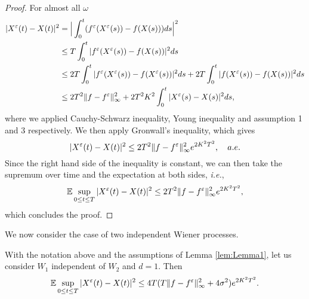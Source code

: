 \begin{proof}
For almost all $\omega$
\begin{equation*}
\begin{aligned}
	|X^\varepsilon(t) - X(t)|^2  &= \Big|\int_0^t (f^\varepsilon (X^\varepsilon(s)) - f(X(s)))ds \Big|^2 \\
	&\leq T \int_0^t |f^\varepsilon (X^\varepsilon(s)) - f(X(s))|^2 ds  \\
	&\leq 2T \int_0^t |f^\varepsilon (X^\varepsilon(s)) - f(X^\varepsilon(s))|^2 ds + 2T \int_0^t |f (X^\varepsilon(s)) - f(X(s))|^2 ds \\
	&\leq 2T^2 \|f - f^\varepsilon\|_{\infty}^2 + 2T^2K^2 \int_0^t |X^\varepsilon(s) - X(s)|^2ds,
\end{aligned} 
\end{equation*}
where we applied Cauchy-Schwarz inequality, Young inequality and assumption 1 and 3 respectively. We then apply Gronwall's inequality, which gives 
\begin{equation}\label{eq:TheoryEpsilon}
	|X^\varepsilon(t) - X(t)|^2 \leq  2T^2 \|f - f^\varepsilon\|_{\infty}^2 e^{2K^2T^2}, \quad a.e.
\end{equation}
Since the right hand side of the inequality is constant, we can then take the supremum over time and the expectation at both sides, \textit{i.e.},
\begin{equation*}
	\mathbb{E} \sup_{0 \leq t \leq T} |X^\varepsilon(t) - X(t)|^2 \leq  2T^2 \|f - f^\varepsilon\|_{\infty}^2 e^{2K^2T^2},
\end{equation*}
which concludes the proof.
\end{proof}
\noindent We now consider the case of two independent Wiener processes.

\begin{lemma}\label{lem:Lemma2} With the notation above and the assumptions of Lemma \ref{lem:Lemma1}, let us consider $W_1$ independent of $W_2$ and $d = 1$. Then
\begin{equation*}	
	\mathbb{E} \sup_{0 \leq t \leq T} |X^\varepsilon(t) - X(t)|^2 \leq 4T(T \|f - f^\varepsilon\|_{\infty}^2 + 4\sigma^2) e^{2K^2T^2}.
\end{equation*}
\end{lemma}

